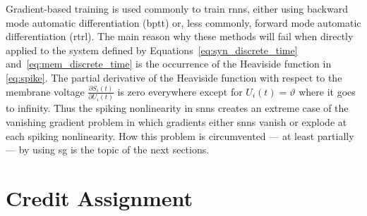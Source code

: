 \documentclass[journal,onecolumn,11pt]{IEEEtran}
\begin{document}
Gradient-based training is used commonly to train \glspl{rnn}, either using
backward mode automatic differentiation (\gls{bptt}) or, less commonly, forward
mode automatic differentiation (\gls{rtrl}).  The main reason why these methods
will fail when directly applied to the system defined by
Equations~\eqref{eq:syn_discrete_time} and~\eqref{eq:mem_discrete_time} is the
occurrence of the Heaviside function in \eqref{eq:spike}.  The partial
derivative of the Heaviside function with respect to the membrane voltage
$\frac{\partial S_i(t)}{\partial U_i(t)}$ is zero everywhere except for
$U_i(t)=\vartheta$ where it goes to infinity.  Thus the spiking nonlinearity in
\glspl{snn} creates an extreme case of the vanishing gradient problem in which
gradients either \glspl{snn} vanish or explode at each spiking nonlinearity.
How this problem is circumvented --- at least partially --- by using \gls{sg} is
the topic of the next sections.


\section{Credit Assignment}
\label{sec:credit_assignment}

\end{document}
